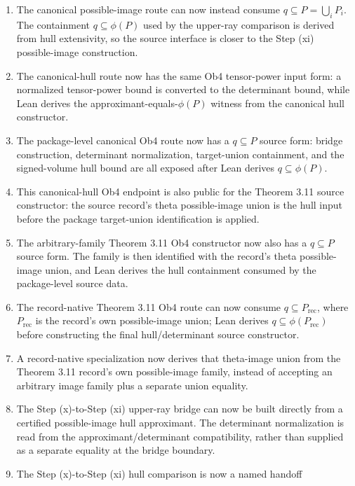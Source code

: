 \documentclass[11pt]{article}
\newcommand{\Lean}{Lean}
\theoremstyle{plain}
\theoremstyle{definition}
\theoremstyle{remark}
\begin{document}
\begin{enumerate}
  q-pilot containment is imposed in this hull, and the endpoint exposes the
  derived approximant-region equality.
\item The canonical possible-image route can now instead consume
  \(q\subseteq P=\bigcup_i P_i\).  The containment \(q\subseteq\phi(P)\) used
  by the upper-ray comparison is derived from hull extensivity, so the source
  interface is closer to the Step (xi) possible-image construction.
\item The canonical-hull route now has the same Ob4 tensor-power input form:
  a normalized tensor-power bound is converted to the determinant bound, while
  \Lean{} derives the approximant-equals-\(\phi(P)\) witness from the canonical
  hull constructor.
\item The package-level canonical Ob4 route now has a \(q\subseteq P\) source
  form: bridge construction, determinant normalization, target-union
  containment, and the signed-volume hull bound are all exposed after \Lean{}
  derives \(q\subseteq\phi(P)\).
\item This canonical-hull Ob4 endpoint is also public for the Theorem 3.11
  source constructor: the source record's theta possible-image union is the
  hull input before the package target-union identification is applied.
\item The arbitrary-family Theorem 3.11 Ob4 constructor now also has a
  \(q\subseteq P\) source form.  The family is then identified with the
  record's theta possible-image union, and \Lean{} derives the hull containment
  consumed by the package-level source data.
\item The record-native Theorem 3.11 Ob4 route can now consume
  \(q\subseteq P_{\mathrm{rec}}\), where \(P_{\mathrm{rec}}\) is the record's
  own possible-image union; \Lean{} derives
  \(q\subseteq\phi(P_{\mathrm{rec}})\) before constructing the final
  hull/determinant source constructor.
\item A record-native specialization now derives that theta-image union from
  the Theorem 3.11 record's own possible-image family, instead of accepting an
  arbitrary image family plus a separate union equality.
\item The Step (x)-to-Step (xi) upper-ray bridge can now be built directly
  from a certified possible-image hull approximant.  The determinant
  normalization is read from the approximant/determinant compatibility, rather
  than supplied as a separate equality at the bridge boundary.
\item The Step (x)-to-Step (xi) hull comparison is now a named handoff

\end{enumerate}
\end{document}
